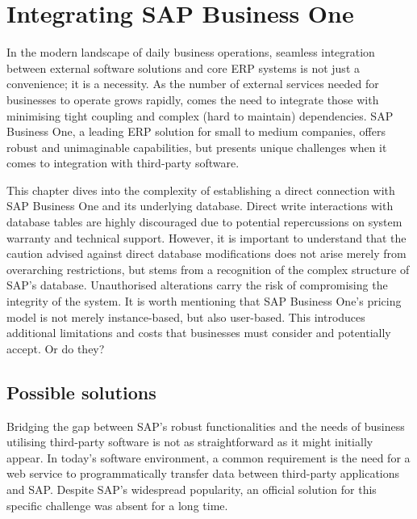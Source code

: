 \chapter{Integrating SAP Business One}
\label{chap:integrating-sap-b1}

In the modern landscape of daily business operations, seamless integration between external software solutions and core \ac{ERP} systems is not just a convenience; it is a necessity.
As the number of external services needed for businesses to operate grows rapidly, comes the need to integrate those with minimising tight coupling and complex (hard to maintain) dependencies.
SAP Business One, a leading \ac{ERP} solution for small to medium companies, offers robust and unimaginable capabilities, but presents unique challenges when it comes to integration with third-party software. 

This chapter dives into the complexity of establishing a direct connection with SAP Business One and its underlying database. 
Direct write interactions with database tables are highly discouraged due to potential repercussions on system warranty and technical support.
However, it is important to understand that the caution advised against direct database modifications does not arise merely from overarching restrictions, but stems from a recognition of the complex structure of SAP's database. Unauthorised alterations carry the risk of compromising the integrity of the system.
It is worth mentioning that SAP Business One's pricing model is not merely instance-based, but also user-based.
This introduces additional limitations and costs that businesses must consider and potentially accept. 
Or do they?

\section{Possible solutions}
\label{sec:possible-solutions}

Bridging the gap between SAP's robust functionalities and the needs of business utilising third-party software is not as straightforward as it might initially appear. 
In today's software environment, a common requirement is the need for a web service to programmatically transfer data between third-party applications and SAP.
Despite SAP's widespread popularity, an official solution for this specific challenge was absent for a long time.

